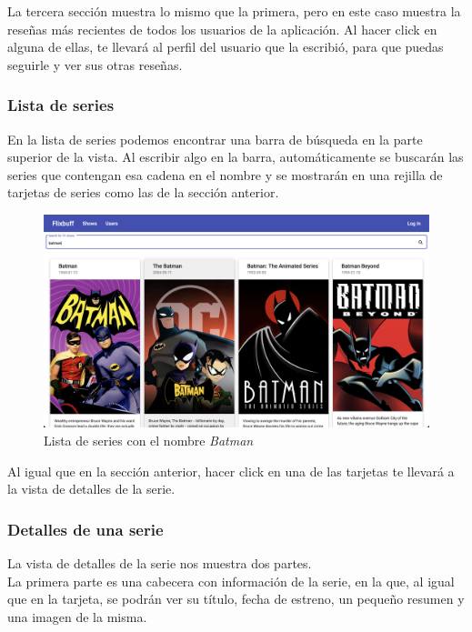 La tercera sección muestra lo mismo que la primera, pero en este caso muestra la reseñas más recientes de todos los
usuarios de la aplicación. Al hacer click en alguna de ellas, te llevará al perfil del usuario que la escribió, para que
puedas seguirle y ver sus otras reseñas.\\

\subsubsection{Lista de series}
En la lista de series podemos encontrar una barra de búsqueda en la parte superior de la vista. Al escribir algo en la
barra, automáticamente se buscarán las series que contengan esa cadena en el nombre y se mostrarán en una rejilla de
tarjetas de series como las de la sección anterior.\\

\begin{figure}[H]
    \centering	
        \includegraphics[scale=0.25]{img/show-list.png}
    \caption{ Lista de series con el nombre \textit{Batman} }\label{fig:show-list}
\end{figure}

Al igual que en la sección anterior, hacer click en una de las tarjetas te llevará a la vista de detalles de la serie.\\

\subsubsection{Detalles de una serie}
La vista de detalles de la serie nos muestra dos partes. \\

La primera parte es una cabecera con información de la serie, en la que, al igual que en la tarjeta, se podrán ver su
título, fecha de estreno, un pequeño resumen y una imagen de la misma.\\

